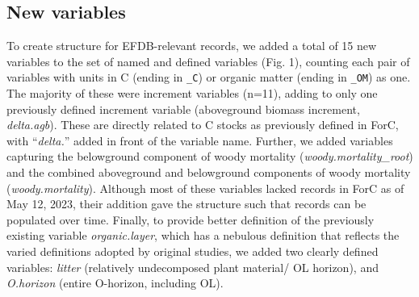 \documentclass[, manuscript]{copernicus}
\begin{document}
\subsection{New variables}

To create structure for EFDB-relevant records, we added a total of 15
new variables to the set of named and defined variables (Fig. 1),
counting each pair of variables with units in C (ending in \texttt{\_C})
or organic matter (ending in \texttt{\_OM}) as one. The majority of
these were increment variables (n=11), adding to only one previously
defined increment variable (aboveground biomass increment,
\emph{delta.agb}). These are directly related to C stocks as previously
defined in ForC, with ``\emph{delta.}'' added in front of the variable
name. Further, we added variables capturing the belowground component of
woody mortality (\emph{woody.mortality\_root}) and the combined
aboveground and belowground components of woody mortality
(\emph{woody.mortality}). Although most of these variables lacked
records in ForC as of May 12, 2023, their addition gave the structure
such that records can be populated over time. Finally, to provide better
definition of the previously existing variable \emph{organic.layer},
which has a nebulous definition that reflects the varied definitions
adopted by original studies, we added two clearly defined variables:
\emph{litter} (relatively undecomposed plant material/ OL horizon), and
\emph{O.horizon} (entire O-horizon, including OL).
\end{document}
